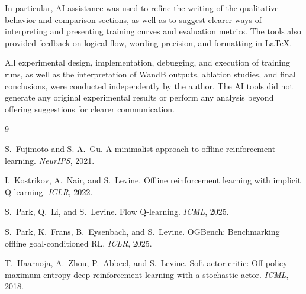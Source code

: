 \documentclass{article}
\begin{document}
In particular, AI assistance was used to refine the writing of the qualitative behavior and comparison sections, as well as to suggest clearer ways of interpreting and presenting training curves and evaluation metrics. The tools also provided feedback on logical flow, wording precision, and formatting in \LaTeX.

All experimental design, implementation, debugging, and execution of training runs, as well as the interpretation of WandB outputs, ablation studies, and final conclusions, were conducted independently by the author. The AI tools did not generate any original experimental results or perform any analysis beyond offering suggestions for clearer communication.



\begin{thebibliography}{9}

S.~Fujimoto and S.-A.~Gu.
\newblock A minimalist approach to offline reinforcement learning.
\newblock \emph{NeurIPS}, 2021.

I.~Kostrikov, A.~Nair, and S.~Levine.
\newblock Offline reinforcement learning with implicit Q-learning.
\newblock \emph{ICLR}, 2022.

S.~Park, Q.~Li, and S.~Levine.
\newblock Flow Q-learning.
\newblock \emph{ICML}, 2025.

S.~Park, K.~Frans, B.~Eysenbach, and S.~Levine.
\newblock OGBench: Benchmarking offline goal-conditioned RL.
\newblock \emph{ICLR}, 2025.

T.~Haarnoja, A.~Zhou, P.~Abbeel, and S.~Levine.
\newblock Soft actor-critic: Off-policy maximum entropy deep reinforcement learning with a stochastic actor.
\newblock \emph{ICML}, 2018.

\end{thebibliography}
\end{document}
